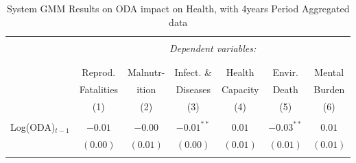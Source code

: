 \renewcommand{\arraystretch}{0.85} %

\begin{table}
\begin{center}
\caption{System GMM Results on ODA impact on Health, with 4years Period Aggregated data}
\begin{tabular}{l c c c c c c}

\\[-1.8ex]\hline 
\hline \\[-1.8ex] 
& \multicolumn{6}{c}{\textit{Dependent variables:}} \\ 
\cline{2-7} 
\\[-1.8ex] & \multicolumn{6}{c}{ } \\ 
 & Reprod. & Malnutr-  & Infect. \& & Health & Envir. & Mental\\
 & Fatalities & ition & Diseases & Capacity & Death & Burden \\
 & (1) & (2) & (3) & (4) & (5) & (6) \\
\hline 
& & & & & & \\
Log(ODA)$_{t-1}$        & $-0.01$      & $-0.00$       & $-0.01^{**}$ & $0.01$       & $-0.03^{**}$  & $0.01$       \\
                                     & $(0.00)$     & $(0.01)$      & $(0.00)$     & $(0.01)$     & $(0.01)$      & $(0.01)$     \\
& & & & & & \\
                                     

\end{tabular}
\end{center}
\end{table}
